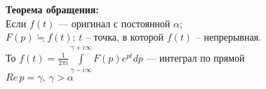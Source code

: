 \textbf{Теорема обращения:}\\
Если $f(t)$ --- оригинал с постоянной $\alpha$;\\
\hspace*{1 cm} $F(p)\fallingdotseq f(t)$; $t$ -- точка, в которой $f(t)$ -- непрерывная.\\
То $f(t)=\frac{1}{2\pi i}\int\limits_{\gamma-i\infty}^{\gamma+i\infty} F(p)e^{pt}dp$ --- интеграл по прямой\\
\hspace*{1cm} $Re\, p=\gamma, \ \gamma > \alpha$\\
